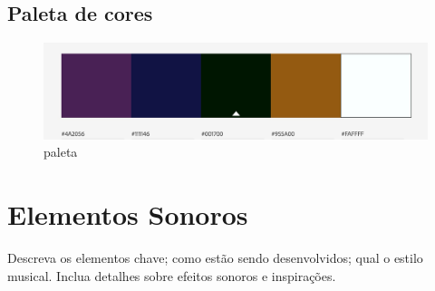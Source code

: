 \subsection{Paleta de cores}
\begin{figure}[htb]
	\caption{\label{paleta}paleta}
	\begin{center}
	    \includegraphics[width=\textwidth/2]{imagens/paleta.jpg}
	\end{center}
\end{figure}

\section{Elementos Sonoros}

Descreva os elementos chave; como estão sendo desenvolvidos; qual o estilo musical. Inclua detalhes sobre efeitos sonoros e inspirações.
